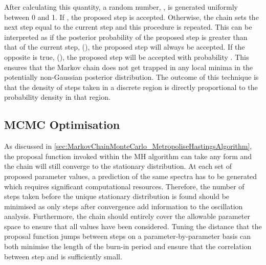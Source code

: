 After calculating this quantity, a random number, \quickmath{\beta}, is generated uniformly between 0 and 1. If , the proposed step is accepted. Otherwise, the chain sets the next step equal to the current step and this procedure is repeated. This can be interpreted as if the posterior probability of the proposed step is greater than that of the current step, (), the proposed step will always be accepted. If the opposite is true, (), the proposed step will be accepted with probability . This ensures that the Markov chain does not get trapped in any local minima in the potentially non-Gaussian posterior distribution. The outcome of this technique is that the density of steps taken in a discrete region is directly proportional to the probability density in that region.

\subsection{MCMC Optimisation}
\label{sec:MarkovChainMonteCarlo_MCMCOptimisation}
As discussed in \autoref{sec:MarkovChainMonteCarlo_MetropoliseHastingsAlgorithm}, the proposal function invoked within the MH algorithm can take any form and the chain will still converge to the stationary distribution. At each set of proposed parameter values, a prediction of the same spectra has to be generated which requires significant computational resources. Therefore, the number of steps taken before the unique stationary distribution is found should be minimised as only steps after convergence add information to the oscillation analysis. Furthermore, the chain should entirely cover the allowable parameter space to ensure that all values have been considered. Tuning the distance that the proposal function jumps between steps on a parameter-by-parameter basis can both minimise the length of the burn-in period and ensure that the correlation between step  and  is sufficiently small.

